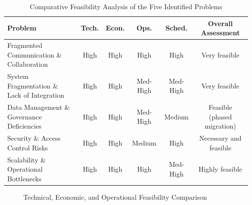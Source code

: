 \documentclass[12pt,a4paper]{report}
\begin{document}
\begin{table}[H]
\centering
\renewcommand{\arraystretch}{1.4}
\small
\begin{tabularx}{\textwidth}{|>{\raggedright\arraybackslash}X|c|c|c|c|c|}
\hline
\rowcolor{secondary}
\textbf{Problem} & \textbf{Tech.} & \textbf{Econ.} & \textbf{Ops.} & \textbf{Sched.} & \textbf{Overall Assessment} \\
\hline
Fragmented Communication \& Collaboration & High & High & High & High & Very feasible \\
\hline
System Fragmentation \& Lack of Integration & High & High & Med-High & Med-High & Very feasible \\
\hline
Data Management \& Governance Deficiencies & High & High & Med-High & Medium & Feasible (phased migration) \\
\hline
Security \& Access Control Risks & High & High & Medium & High & Necessary and feasible \\
\hline
Scalability \& Operational Bottlenecks & High & High & High & Med-High & Highly feasible \\
\hline
\end{tabularx}
\caption{Comparative Feasibility Analysis of the Five Identified Problems}
\end{table}

\begin{figure}[H]
\centering
{}
\caption{Technical, Economic, and Operational Feasibility Comparison}
\end{figure}
\end{document}

